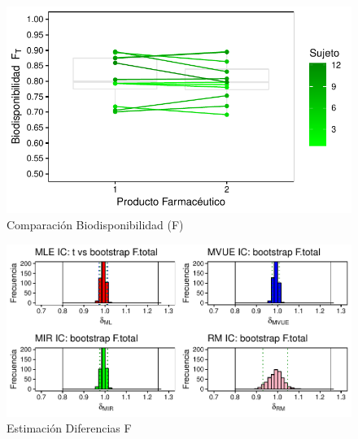 \documentclass[]{article}
\begin{document}
\begin{figure}[H]

{\centering \includegraphics{parcial_1_files/figure-latex/unnamed-chunk-34-1} 

}

\caption{Comparación Biodisponibilidad (F)}\label{fig:unnamed-chunk-34}
\end{figure}

\begin{figure}[H]

{\centering \includegraphics{parcial_1_files/figure-latex/unnamed-chunk-35-1} 

}

\caption{Estimación Diferencias F}\label{fig:unnamed-chunk-35}
\end{figure}
\end{document}
